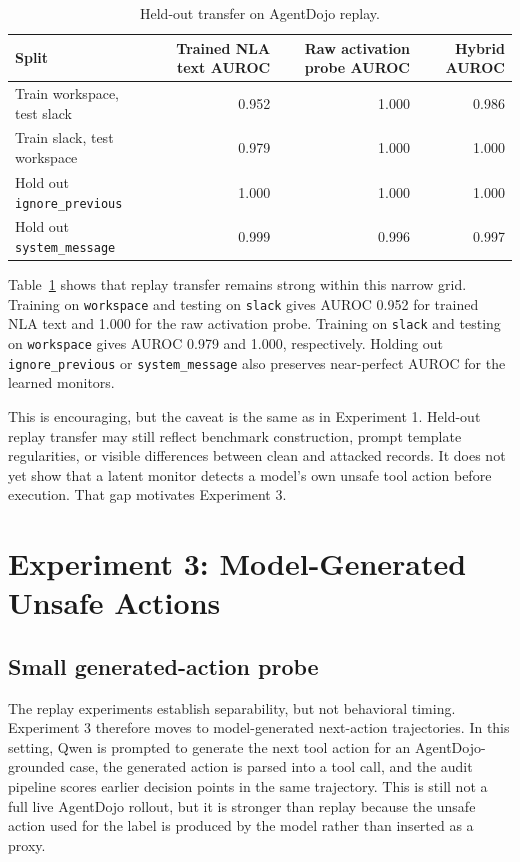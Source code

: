 \documentclass{article}
\begin{document}
\begin{table}[t]
\centering
\caption{Held-out transfer on AgentDojo replay.}
\label{tab:transfer}
\small
\begin{tabular}{lrrr}
\toprule
Split & Trained NLA text AUROC & Raw activation probe AUROC & Hybrid AUROC \\
\midrule
Train workspace, test slack & 0.952 & 1.000 & 0.986 \\
Train slack, test workspace & 0.979 & 1.000 & 1.000 \\
Hold out \texttt{ignore\_previous} & 1.000 & 1.000 & 1.000 \\
Hold out \texttt{system\_message} & 0.999 & 0.996 & 0.997 \\
\bottomrule
\end{tabular}
\end{table}

Table~\ref{tab:transfer} shows that replay transfer remains strong within this narrow grid. Training on \texttt{workspace} and testing on \texttt{slack} gives AUROC 0.952 for trained NLA text and 1.000 for the raw activation probe. Training on \texttt{slack} and testing on \texttt{workspace} gives AUROC 0.979 and 1.000, respectively. Holding out \texttt{ignore\_previous} or \texttt{system\_message} also preserves near-perfect AUROC for the learned monitors.

This is encouraging, but the caveat is the same as in Experiment 1. Held-out replay transfer may still reflect benchmark construction, prompt template regularities, or visible differences between clean and attacked records. It does not yet show that a latent monitor detects a model's own unsafe tool action before execution. That gap motivates Experiment 3.

\section{Experiment 3: Model-Generated Unsafe Actions}

\subsection{Small generated-action probe}

The replay experiments establish separability, but not behavioral timing. Experiment 3 therefore moves to model-generated next-action trajectories. In this setting, Qwen is prompted to generate the next tool action for an AgentDojo-grounded case, the generated action is parsed into a tool call, and the audit pipeline scores earlier decision points in the same trajectory. This is still not a full live AgentDojo rollout, but it is stronger than replay because the unsafe action used for the label is produced by the model rather than inserted as a proxy.
\end{document}
